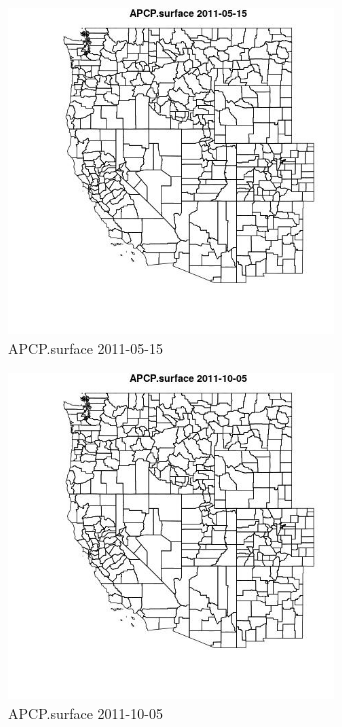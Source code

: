 \begin{figure} 
\centering  
\includegraphics[width=0.77\textwidth]{Code_Outputs/ML_input_report_ML_input_PM25_Step5_part_d_de_duplicated_aves_ML_input_MapObsAPCPsurface2011-05-15.jpg} 
\caption{\label{fig:ML_input_report_ML_input_PM25_Step5_part_d_de_duplicated_aves_ML_inputMapObsAPCPsurface2011-05-15}APCP.surface 2011-05-15} 
\end{figure} 
 

\clearpage 

\begin{figure} 
\centering  
\includegraphics[width=0.77\textwidth]{Code_Outputs/ML_input_report_ML_input_PM25_Step5_part_d_de_duplicated_aves_ML_input_MapObsAPCPsurface2011-10-05.jpg} 
\caption{\label{fig:ML_input_report_ML_input_PM25_Step5_part_d_de_duplicated_aves_ML_inputMapObsAPCPsurface2011-10-05}APCP.surface 2011-10-05} 
\end{figure} 
 

